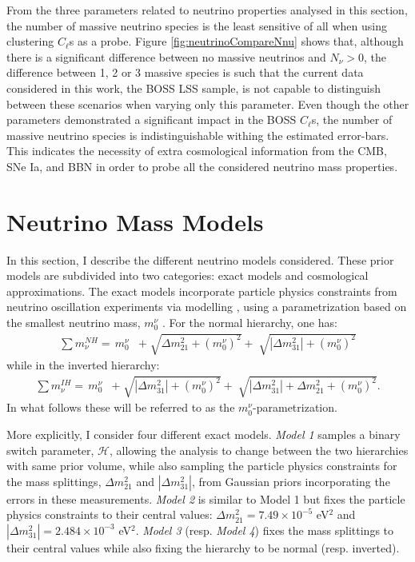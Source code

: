 From the three parameters related to neutrino properties analysed in this section, the number of massive neutrino species is the least sensitive of all when using clustering $C_{\ell}$s as a probe. Figure \ref{fig:neutrinoCompareNnu} shows that, although there is a significant difference between no massive neutrinos and $N_{\nu} > 0$, the difference between 1, 2 or 3 massive species is such that the current data considered in this work, the BOSS LSS sample, is not capable to distinguish between these scenarios when varying only this parameter. Even though the other parameters demonstrated a significant impact in the BOSS $C_{\ell}$s, the number of massive neutrino species is indistinguishable withing the estimated error-bars. This indicates the necessity of extra cosmological information from the CMB, SNe Ia, and BBN in order to probe all the considered neutrino mass properties.

\section{Neutrino Mass Models}

In this section, I describe the different neutrino models considered. These prior models are subdivided into two categories: exact models and cosmological approximations. The exact models incorporate particle physics constraints from neutrino oscillation experiments via modelling \NM{}, using a parametrization based on the smallest neutrino mass, $m_0^{\nu}$ \citep{2012Hannestad,2016Hannestad,2018HeavensNeutrino}. For the normal hierarchy, one has:
\begin{align}
    \sum m_{\nu}^{NH} =\,  m^{\nu}_{0} & + \sqrt[]{\Delta m_{21}^2 + (m^{\nu}_{0})^2} + \sqrt[]{|\Delta m_{31}^2| + (m^{\nu}_{0})^2}
\end{align}
\noindent while in the inverted hierarchy: 
\begin{align}
    \sum m_{\nu}^{IH} =\,  m_0^{\nu} & + \sqrt[]{|\Delta m_{31}^2| + (m_0^{\nu})^2} + \sqrt[]{ |\Delta m_{31}^2| + \Delta m_{21}^2 + (m_0^{\nu})^2}.
\end{align} 
In what follows these will be referred to as the $m_0^{\nu}$-parametrization. 

\qquad More explicitly, I consider four different exact models. \textit{Model 1} samples a binary switch parameter, $\mathcal{H}$, allowing the analysis to change between the two hierarchies with same prior volume, while also sampling the particle physics constraints for the mass splittings, $\Delta m_{21}^2$ and $|\Delta m_{31}^2|$, from Gaussian priors incorporating the errors in these measurements. \textit{Model 2} is similar to Model 1 but fixes the particle physics constraints to their central values: $\Delta m_{21}^2 = 7.49\times 10^{-5}$ eV$^2$ and $|\Delta m_{31}^2| = 2.484\times 10^{-3}$ eV$^2$. \textit{Model 3} (resp. \textit{Model 4}) fixes the mass splittings to their central values while also fixing the hierarchy to be normal (resp. inverted).

